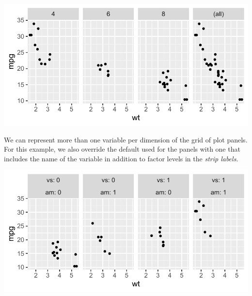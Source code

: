 \documentclass[krantz2]{krantz}\usepackage{knitr}
\begin{document}
\begin{knitrout}\footnotesize
{}\color{fgcolor}\begin{kframe}
\begin{alltt}
 \hlopt{+} \hlstd{(} \hlstd{=}   \hlstd{=} \hlstd{)}
\end{alltt}
\end{kframe}

{\centering \includegraphics[width=.7\textwidth]{figure/pos-facets-06-1} 

}



\end{knitrout}

We can represent more than one variable per dimension of the grid of plot panels. For this example, we also override the default  used for the panels with one that includes the name of the variable in addition to factor levels in the \emph{strip labels}.

\begin{knitrout}\footnotesize
{}\color{fgcolor}\begin{kframe}
\begin{alltt}
 \hlopt{+} \hlstd{(} \hlstd{=}   
\end{alltt}
\end{kframe}

{\centering \includegraphics[width=.7\textwidth]{figure/pos-facets-07-1} 

}



\end{knitrout}
\end{document}
